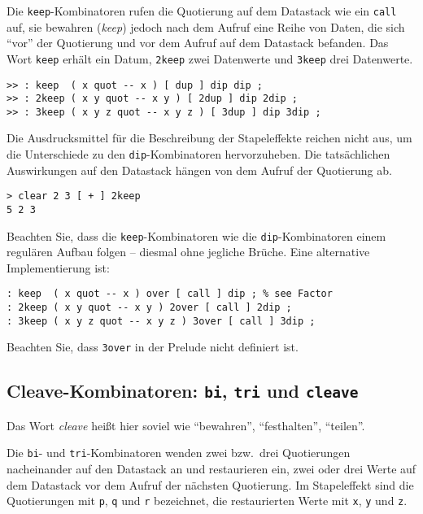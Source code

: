 Die \verb|keep|-Kombinatoren rufen die Quotierung auf dem Datastack wie ein \verb|call| auf, sie bewahren (\emph{keep}) jedoch nach dem Aufruf eine Reihe von Daten, die sich "`vor"' der Quotierung und vor dem Aufruf auf dem Datastack befanden. Das Wort \verb|keep| erhält ein Datum, \verb|2keep| zwei Datenwerte und \verb|3keep| drei Datenwerte.

\begin{verbatim}
>> : keep  ( x quot -- x ) [ dup ] dip dip ;
>> : 2keep ( x y quot -- x y ) [ 2dup ] dip 2dip ;
>> : 3keep ( x y z quot -- x y z ) [ 3dup ] dip 3dip ;
\end{verbatim}

Die Ausdrucksmittel für die Beschreibung der Stapeleffekte reichen nicht aus, um die Unterschiede zu den \verb|dip|-Kombinatoren hervorzuheben. Die tatsächlichen Auswirkungen auf den Datastack hängen von dem Aufruf der Quotierung ab.

\begin{verbatim}
> clear 2 3 [ + ] 2keep
5 2 3
\end{verbatim}

Beachten Sie, dass die \verb|keep|-Kombinatoren wie die \verb|dip|-Kombinatoren einem regulären Aufbau folgen -- diesmal ohne jegliche Brüche. Eine alternative Implementierung ist:

\begin{verbatim}
: keep  ( x quot -- x ) over [ call ] dip ; % see Factor
: 2keep ( x y quot -- x y ) 2over [ call ] 2dip ;
: 3keep ( x y z quot -- x y z ) 3over [ call ] 3dip ;
\end{verbatim}

Beachten Sie, dass \verb|3over| in der Prelude nicht definiert ist.

\subsection{Cleave-Kombinatoren: \texttt{bi}, \texttt{tri} und \texttt{cleave}}

Das Wort \emph{cleave} heißt hier soviel wie "`bewahren"', "`festhalten"', "`teilen"'.

Die \verb|bi|- und \verb|tri|-Kombinatoren wenden zwei bzw.\ drei Quotierungen nacheinander auf den Datastack an und restaurieren ein, zwei oder drei Werte auf dem Datastack vor dem Aufruf der nächsten Quotierung. Im Stapeleffekt sind die Quotierungen mit \verb|p|, \verb|q| und \verb|r| bezeichnet, die restaurierten Werte mit \verb|x|, \verb|y| und \verb|z|.

